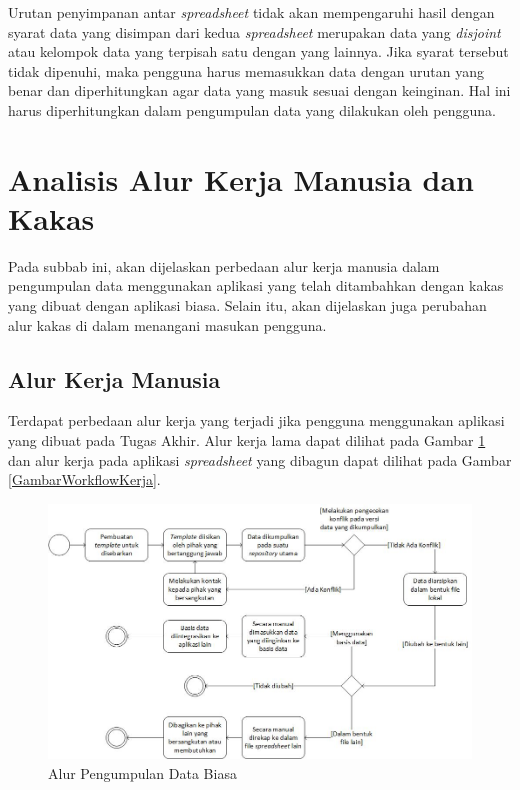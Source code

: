 Urutan penyimpanan antar \textit{spreadsheet} tidak akan mempengaruhi hasil dengan syarat data yang disimpan dari kedua \textit{spreadsheet} merupakan data yang \textit{disjoint} atau kelompok data yang terpisah satu dengan yang lainnya. Jika syarat tersebut tidak dipenuhi, maka pengguna harus memasukkan data dengan urutan yang benar dan diperhitungkan agar data yang masuk sesuai dengan keinginan. Hal ini harus diperhitungkan dalam pengumpulan data yang dilakukan oleh pengguna.

\section{Analisis Alur Kerja Manusia dan Kakas} \label{Aluralur}
Pada subbab ini, akan dijelaskan perbedaan alur kerja manusia dalam pengumpulan data menggunakan aplikasi yang telah ditambahkan dengan kakas yang dibuat dengan aplikasi biasa. Selain itu, akan dijelaskan juga perubahan alur kakas di dalam menangani masukan pengguna.

\subsection{Alur Kerja Manusia}
Terdapat perbedaan alur kerja yang terjadi jika pengguna menggunakan aplikasi yang dibuat pada Tugas Akhir. Alur kerja lama dapat dilihat pada Gambar \ref{GambarWorkflowKerjaBiasa} dan alur kerja pada aplikasi \textit{spreadsheet} yang dibagun dapat dilihat pada Gambar \ref{GambarWorkflowKerja}.

\begin{figure}[!htb]
    \centering
    \includegraphics[width=1\textwidth]{resources/chapter-3-workflow-kerja-biasa.jpg}
    \caption{Alur Pengumpulan Data Biasa}
	\label{GambarWorkflowKerjaBiasa}
\end{figure}


